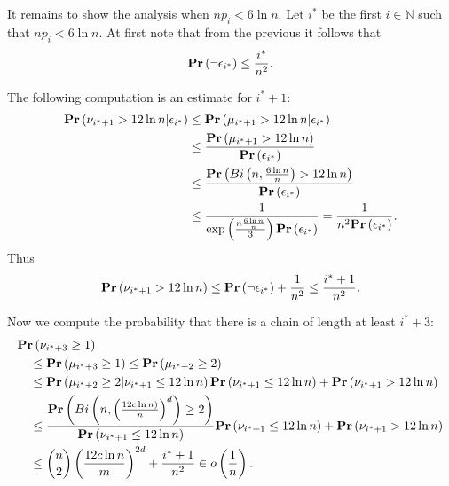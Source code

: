 It remains to show the analysis when $np_i < 6 \ln n$. Let $i^*$ be the first $i \in \mathbb{N}$ such that $np_i < 6\ln n$. 
At first note that from the previous it follows that 
\[
\mathbf{Pr}\left(\neg \epsilon_{i^*}\right) \leq \frac{i^*}{n ^ 2} \textit{.}
\]

The following computation is an estimate for $i^* + 1$:
\[
\begin{split}
\mathbf{Pr}\left(\nu_{i^* + 1} > 12 \ln n | \epsilon_{i^*}\right) 
	& \leq \mathbf{Pr}\left(\mu_{i^* + 1} > 12 \ln n | \epsilon_{i^*}\right) \\
	& \leq \frac{\mathbf{Pr}\left(\mu_{i^* + 1} > 12 \ln n\right)}{\mathbf{Pr}\left(\epsilon_{i^*}\right)} \\
	& \leq \frac{\mathbf{Pr}\left(Bi\left(n, \frac{6 \ln n}{n}\right) > 12 \ln n\right)}{\mathbf{Pr}\left(\epsilon_{i^*}\right)} \\
	& \leq \frac{1}{\exp\left(\frac{n\frac{6 \ln n}{n}}{3}\right)\mathbf{Pr}\left(\epsilon_{i^*}\right)} = \frac{1}{n ^ 2 \mathbf{Pr}\left(\epsilon_{i^*}\right)} \textit{.}
\end{split}
\]
Thus
\[
\mathbf{Pr}\left(\nu_{i^* + 1} > 12 \ln n\right) \leq \mathbf{Pr}\left(\neg \epsilon_{i^*}\right) + \frac{1}{n ^ 2} \leq \frac{i^* + 1}{n ^ 2} \textit{.}
\]

Now we compute the probability that there is a chain of length at least $i^* + 3$:
\[
\begin{split}
& \mathbf{Pr}\left(\nu_{i^* + 3} \geq 1\right) \\
	& \quad \leq \mathbf{Pr}\left(\mu_{i^* + 3} \geq 1\right) \leq \mathbf{Pr}\left(\mu_{i^* + 2} \geq 2\right) \\
	& \quad \leq \mathbf{Pr}\left(\mu_{i^* + 2} \geq 2 | \nu_{i^* + 1} \leq 12 \ln n\right)\mathbf{Pr}\left(\nu_{i^* + 1} \leq 12 \ln n\right) + \mathbf{Pr}\left(\nu_{i^* + 1} > 12 \ln n\right) \\	& \quad \leq \frac{\mathbf{Pr}\left(Bi\left(n, \left(\frac{12 c \ln n)}{n}\right) ^ d\right) \geq 2\right)}{\mathbf{Pr}\left(\nu_{i^* + 1} \leq 12 \ln n\right)}\mathbf{Pr}\left(\nu_{i^* + 1} \leq 12 \ln n\right) + \mathbf{Pr}\left(\nu_{i^* + 1} > 12 \ln n\right) \\
	& \quad \leq \binom{n}{2} \left(\frac{12 c \ln n}{m}\right) ^ {2d} + \frac{i^* + 1}{n ^ 2} \in o\left(\frac{1}{n}\right) \textit{.}
\end{split}
\]

